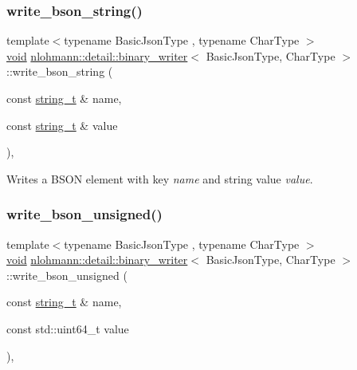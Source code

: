 \subsubsection{\texorpdfstring{write\+\_\+bson\+\_\+string()}{write\_bson\_string()}}
{\footnotesize\ttfamily template$<$typename Basic\+Json\+Type , typename Char\+Type $>$ \\
\hyperlink{namespacenlohmann_1_1detail_a59fca69799f6b9e366710cb9043aa77d}{void} \hyperlink{classnlohmann_1_1detail_1_1binary__writer}{nlohmann\+::detail\+::binary\+\_\+writer}$<$ Basic\+Json\+Type, Char\+Type $>$\+::write\+\_\+bson\+\_\+string (\begin{DoxyParamCaption}\item[{const \hyperlink{classnlohmann_1_1detail_1_1binary__writer_a29f2ae7a5c4a8c1dae47b3b2310de8a8}{string\+\_\+t} \&}]{name,  }\item[{const \hyperlink{classnlohmann_1_1detail_1_1binary__writer_a29f2ae7a5c4a8c1dae47b3b2310de8a8}{string\+\_\+t} \&}]{value }\end{DoxyParamCaption})\hspace{0.3cm}{\ttfamily [inline]}, {\ttfamily [private]}}



Writes a B\+S\+ON element with key {\itshape name} and string value {\itshape value}. 

\mbox{\label{classnlohmann_1_1detail_1_1binary__writer_a5e295ed1be6af6260d2a65f7397c3742}} 
\subsubsection{\texorpdfstring{write\+\_\+bson\+\_\+unsigned()}{write\_bson\_unsigned()}}
{\footnotesize\ttfamily template$<$typename Basic\+Json\+Type , typename Char\+Type $>$ \\
\hyperlink{namespacenlohmann_1_1detail_a59fca69799f6b9e366710cb9043aa77d}{void} \hyperlink{classnlohmann_1_1detail_1_1binary__writer}{nlohmann\+::detail\+::binary\+\_\+writer}$<$ Basic\+Json\+Type, Char\+Type $>$\+::write\+\_\+bson\+\_\+unsigned (\begin{DoxyParamCaption}\item[{const \hyperlink{classnlohmann_1_1detail_1_1binary__writer_a29f2ae7a5c4a8c1dae47b3b2310de8a8}{string\+\_\+t} \&}]{name,  }\item[{const std\+::uint64\+\_\+t}]{value }\end{DoxyParamCaption})\hspace{0.3cm}{\ttfamily [inline]}, {\ttfamily [private]}}



